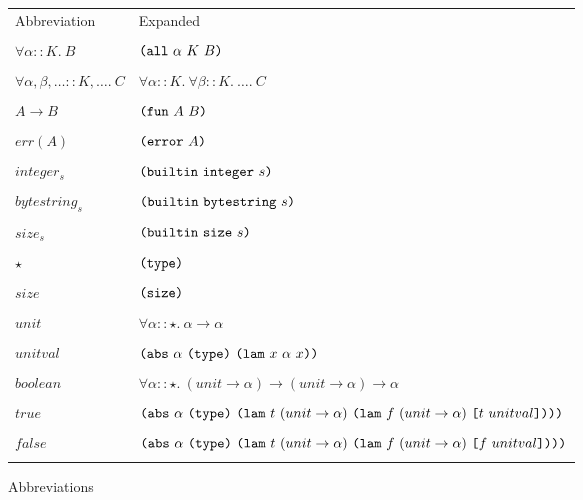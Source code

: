 \documentclass[../main.tex]{subfiles}
\begin{document}
\begin{figure*}[t]
    \footnotesize

    \begin{tabular}{ll}
        \textrm{Abbreviation} & \textrm{Expanded}\\\\

        $\forall \alpha :: K.\ B$ & \(\texttt{(} \texttt{all} ~ \alpha ~ K ~ B \texttt{)}\)\\\\

        $\forall \alpha, \beta, \ldots :: K, \ldots.\ C$ & \(\forall \alpha :: K.\ \forall \beta :: K.\ \ldots.\ C\)\\\\

        $A \to B$ & \(\texttt{(} \texttt{fun} ~ A ~ B \texttt{)}\)\\\\

        $err(A)$ & \(\texttt{(} \texttt{error} ~ A \texttt{)}\)\\\\

        $integer_s$ & \(\texttt{(} \texttt{builtin} ~ \texttt{integer} ~ s \texttt{)}\)\\\\

        $bytestring_s$ & \(\texttt{(} \texttt{builtin} ~ \texttt{bytestring} ~ s \texttt{)}\)\\\\

        $size_s$ & \(\texttt{(} \texttt{builtin} ~ \texttt{size} ~ s \texttt{)}\)\\\\

        $\star$ & \(\texttt{(} \texttt{type} \texttt{)}{}\)\\\\

        $size$ & \(\texttt{(} \texttt{size} \texttt{)}{}\)\\\\

        $unit$ & \(\forall \alpha :: \star.\ \alpha \to \alpha\)\\\\

        $unitval$ & \(\texttt{(} \texttt{abs} ~ \alpha ~ \texttt{(} \texttt{type} \texttt{)}{} ~ \texttt{(} \texttt{lam} ~ x ~ \alpha ~ x \texttt{)} \texttt{)}\)\\\\

        $boolean$ & \(\forall \alpha :: \star.\ (unit \to \alpha) \to (unit \to \alpha) \to \alpha\)\\\\

        $true$ & \(\texttt{(} \texttt{abs} ~ \alpha ~ \texttt{(} \texttt{type} \texttt{)}{} ~ \texttt{(} \texttt{lam} ~ t ~ (unit \to \alpha) ~ \texttt{(} \texttt{lam} ~ f ~ (unit \to \alpha) ~ \texttt{[} t ~ unitval \texttt{]} \texttt{)} \texttt{)} \texttt{)}\)\\\\

        $false$ & \(\texttt{(} \texttt{abs} ~ \alpha ~ \texttt{(} \texttt{type} \texttt{)}{} ~ \texttt{(} \texttt{lam} ~ t ~ (unit \to \alpha) ~ \texttt{(} \texttt{lam} ~ f ~ (unit \to \alpha) ~ \texttt{[} f ~ unitval \texttt{]} \texttt{)} \texttt{)} \texttt{)}\)\\\\

    \end{tabular}

    \caption{Abbreviations}
    \label{fig:Plutus_core_type_abbreviations}
\end{figure*}
\end{document}
